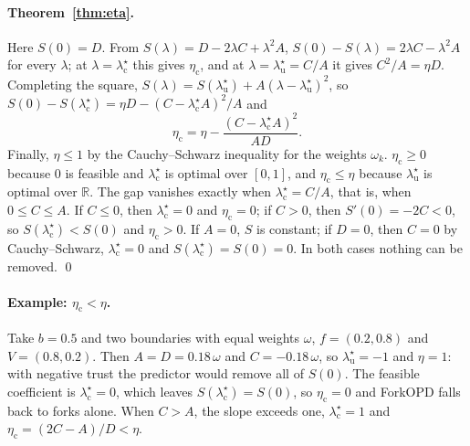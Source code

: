\documentclass[11pt]{article}
\newcommand{\method}{ForkOPD}
\newcommand{\lamu}{\lambda^\star_{\mathrm u}}
\newcommand{\lamc}{\lambda^\star_{\mathrm c}}
\newcommand{\etac}{\eta_{\mathrm c}}
\theoremstyle{remark}
\begin{document}
\paragraph{Theorem~\ref{thm:eta}.}
Here $S(0)=D$. From $S(\lambda)=D-2\lambda C+\lambda^2A$, $S(0)-S(\lambda)=2\lambda C-\lambda^2A$ for every $\lambda$; at $\lambda=\lamc$ this gives $\etac$, and at $\lambda=\lamu=C/A$ it gives $C^2/A=\eta D$. Completing the square, $S(\lambda)=S(\lamu)+A(\lambda-\lamu)^2$, so $S(0)-S(\lamc)=\eta D-(C-\lamc A)^2/A$ and
\begin{equation*}
\etac=\eta-\frac{(C-\lamc A)^2}{AD}.
\end{equation*}
Finally, $\eta\le1$ by the Cauchy--Schwarz inequality for the weights $\omega_k$. $\etac\ge0$ because $0$ is feasible and $\lamc$ is optimal over $[0,1]$, and $\etac\le\eta$ because $\lamu$ is optimal over $\mathbb{R}$. The gap vanishes exactly when $\lamc=C/A$, that is, when $0\le C\le A$. If $C\le0$, then $\lamc=0$ and $\etac=0$; if $C>0$, then $S'(0)=-2C<0$, so $S(\lamc)<S(0)$ and $\etac>0$. If $A=0$, $S$ is constant; if $D=0$, then $C=0$ by Cauchy--Schwarz, $\lamc=0$ and $S(\lamc)=S(0)=0$. In both cases nothing can be removed. \qed

\paragraph{Example: $\etac<\eta$.}
Take $b=0.5$ and two boundaries with equal weights $\omega$, $f=(0.2,0.8)$ and $V=(0.8,0.2)$. Then $A=D=0.18\,\omega$ and $C=-0.18\,\omega$, so $\lamu=-1$ and $\eta=1$: with negative trust the predictor would remove all of $S(0)$. The feasible coefficient is $\lamc=0$, which leaves $S(\lamc)=S(0)$, so $\etac=0$ and \method{} falls back to forks alone. When $C>A$, the slope exceeds one, $\lamc=1$ and $\etac=(2C-A)/D<\eta$.
\end{document}
